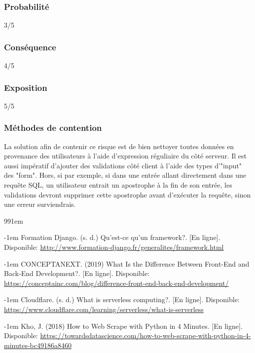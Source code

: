 \documentclass[12pt]{article}
\begin{document}
\subsubsection*{Probabilité}

3/5

\subsubsection*{Conséquence}

4/5

\subsubsection*{Exposition}

5/5

\subsubsection*{Méthodes de contention}

La solution afin de contenir ce risque est de bien nettoyer toutes données en provenance
des utilisateurs à l'aide d'expression réguliaire du côté serveur. Il est 
aussi impératif d'ajouter des validations côté client à l'aide des types
d'"input" des "form". Hors, si par exemple, si dans une entrée allant directement
dans une requête SQL, un utilisateur entrait un apostrophe à la fin de son entrée,
les validations devront supprimer cette apostrophe avant d'exécuter la requête, sinon
une erreur surviendrais.

\newpage 

\def\bibindent{1em}
\begin{thebibliography}{99\kern\bibindent}
\makeatletter
\let\old@biblabel\@biblabel
\def\@biblabel#1{\old@biblabel{#1}\kern\bibindent}
\let\old@bibitem\bibitem
\def\bibitem#1{\old@bibitem{#1}\leavevmode\kern-\bibindent}
\makeatother

    
    Formation Django. (s. d.) Qu'est-ce qu'un framework?. [En ligne].
    Disponible: \url{http://www.formation-django.fr/generalites/framework.html}

    CONCEPTANEXT. (2019) What Is the Difference Between Front-End and Back-End Development?. [En ligne].
    Disponible: \url{https://conceptainc.com/blog/difference-front-end-back-end-development/}
    
    Cloudflare. (s. d.) What is serverless computing?. [En ligne]. Disponible:
    \url{https://www.cloudflare.com/learning/serverless/what-is-serverless}

    Kho, J. (2018) How to Web Scrape with Python in 4 Minutes. [En ligne]. Disponible:
    \url{https://towardsdatascience.com/how-to-web-scrape-with-python-in-4-minutes-bc49186a8460}

    

\end{thebibliography}
\end{document}
